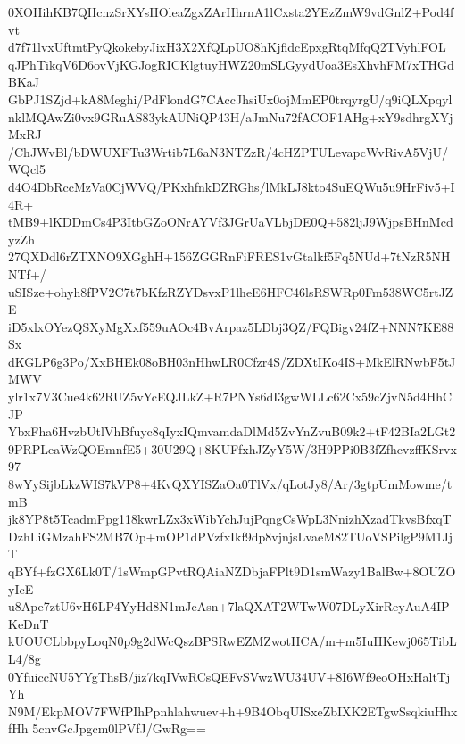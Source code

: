 0XOHihKB7QHcnzSrXYsHOleaZgxZArHhrnA1lCxsta2YEzZmW9vdGnlZ+Pod4fvt
d7f71lvxUftmtPyQkokebyJixH3X2XfQLpUO8hKjfidcEpxgRtqMfqQ2TVyhlFOL
qJPhTikqV6D6ovVjKGJogRICKlgtuyHWZ20mSLGyydUoa3EsXhvhFM7xTHGdBKaJ
GbPJ1SZjd+kA8Meghi/PdFlondG7CAccJhsiUx0ojMmEP0trqyrgU/q9iQLXpqyl
nklMQAwZi0vx9GRuAS83ykAUNiQP43H/aJmNu72fACOF1AHg+xY9sdhrgXYjMxRJ
/ChJWvBl/bDWUXFTu3Wrtib7L6aN3NTZzR/4cHZPTULevapcWvRivA5VjU/WQcl5
d4O4DbRccMzVa0CjWVQ/PKxhfnkDZRGhs/lMkLJ8kto4SuEQWu5u9HrFiv5+I4R+
tMB9+lKDDmCs4P3ItbGZoONrAYVf3JGrUaVLbjDE0Q+582ljJ9WjpsBHnMcdyzZh
27QXDdl6rZTXNO9XGghH+156ZGGRnFiFRES1vGtalkf5Fq5NUd+7tNzR5NHNTf+/
uSISze+ohyh8fPV2C7t7bKfzRZYDsvxP1lheE6HFC46lsRSWRp0Fm538WC5rtJZE
iD5xlxOYezQSXyMgXxf559uAOc4BvArpaz5LDbj3QZ/FQBigv24fZ+NNN7KE88Sx
dKGLP6g3Po/XxBHEk08oBH03nHhwLR0Cfzr4S/ZDXtIKo4IS+MkElRNwbF5tJMWV
ylr1x7V3Cue4k62RUZ5vYcEQJLkZ+R7PNYs6dI3gwWLLc62Cx59cZjvN5d4HhCJP
YbxFha6HvzbUtlVhBfuyc8qIyxIQmvamdaDlMd5ZvYnZvuB09k2+tF42BIa2LGt2
9PRPLeaWzQOEmnfE5+30U29Q+8KUFfxhJZyY5W/3H9PPi0B3fZfhcvzffKSrvx97
8wYySijbLkzWIS7kVP8+4KvQXYISZaOa0TlVx/qLotJy8/Ar/3gtpUmMowme/tmB
jk8YP8t5TcadmPpg118kwrLZx3xWibYchJujPqngCsWpL3NnizhXzadTkvsBfxqT
DzhLiGMzahFS2MB7Op+mOP1dPVzfxIkf9dp8vjnjsLvaeM82TUoVSPilgP9M1JjT
qBYf+fzGX6Lk0T/1sWmpGPvtRQAiaNZDbjaFPlt9D1smWazy1BalBw+8OUZOyIcE
u8Ape7ztU6vH6LP4YyHd8N1mJeAsn+7laQXAT2WTwW07DLyXirReyAuA4IPKeDnT
kUOUCLbbpyLoqN0p9g2dWcQszBPSRwEZMZwotHCA/m+m5IuHKewj065TibLL4/8g
0YfuiccNU5YYgThsB/jiz7kqIVwRCsQEFvSVwzWU34UV+8I6Wf9eoOHxHaltTjYh
N9M/EkpMOV7FWfPIhPpnhlahwuev+h+9B4ObqUISxeZbIXK2ETgwSsqkiuHhxfHh
5cnvGcJpgcm0lPVfJ/GwRg==
